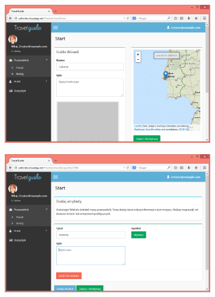 \documentclass[a4paper]{book}
\begin{document}
		\begin{figure}[H]
			\ContinuedFloat
			
			\begin{subfigure}{1\textwidth}
				\includegraphics[width=\textwidth]{screenshots/web/3dodawanie.png}					
				\caption{\label{subfig:web_add}	}
			\end{subfigure}
			\hfill			
			\begin{subfigure}{1\textwidth}
				\includegraphics[width=\textwidth]{screenshots/web/4dodawanie2.png}					
				\caption{\label{subfig:web_add2}}
			\end{subfigure}
			
		\end{figure}
\end{document}
